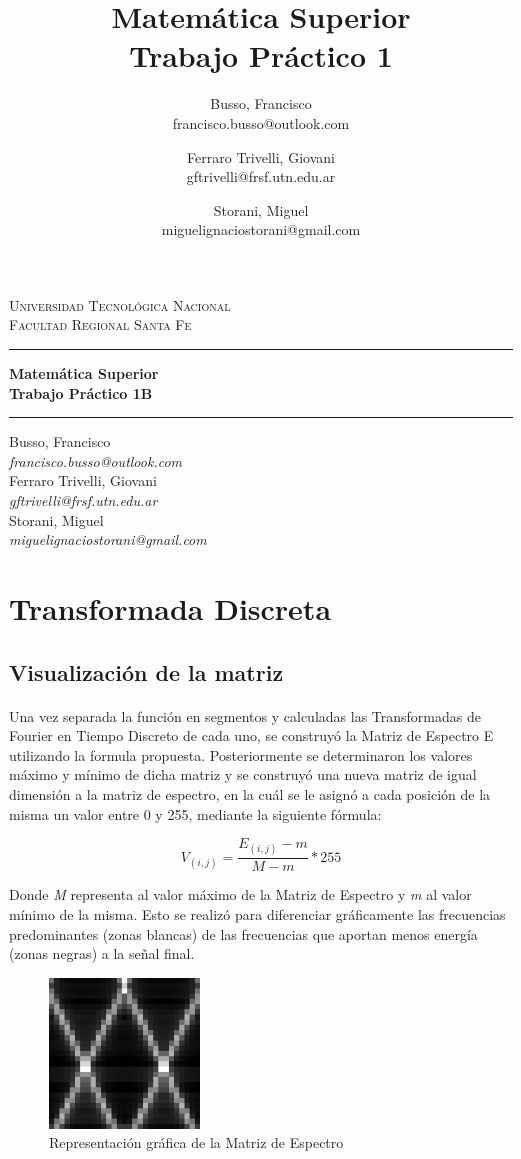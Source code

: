 \documentclass{article}
\title{Matemática Superior\\Trabajo Práctico 1}
\author{ Busso, Francisco\\francisco.busso@outlook.com 
    \and Ferraro Trivelli, Giovani\\gftrivelli@frsf.utn.edu.ar
    \and Storani, Miguel\\ miguelignaciostorani@gmail.com
}
\makeatletter
\renewcommand{\maketitle}{
    \begin{center}
        
        {\scshape{Universidad Tecnológica Nacional\\Facultad Regional Santa Fe}}
        \vspace{10pt}
        \hrule
        \vspace{10pt}
       

        {\LARGE\bfseries{Matemática Superior\\}}
        \vspace{5pt}
        {\Huge\bfseries{Trabajo Práctico 1B}}

        \vspace{8pt}
        \hrule
        \vspace{8pt}

        Busso, Francisco\\
        \textit{francisco.busso@outlook.com}\\
        \vspace{7pt}
        Ferraro Trivelli, Giovani\\
        \textit{gftrivelli@frsf.utn.edu.ar}\\
        \vspace{7pt}
        Storani, Miguel\\
        \textit{miguelignaciostorani@gmail.com}\\

        \thispagestyle{empty}
        
        \newpage
    \end{center}
}
\makeatother
\begin{document}
\maketitle
\newpage

\renewcommand{\contentsname}{Índice}
\tableofcontents
\newpage

    \section{Transformada Discreta}
	\subsection{Visualización de la matriz}

	        \paragraph{}
	        Una vez separada la función en segmentos y calculadas las Transformadas de Fourier en Tiempo Discreto de cada uno, 
	        se construyó la Matriz de Espectro E utilizando la formula propuesta. Posteriormente se determinaron los valores máximo y mínimo de dicha matriz 
	        y se construyó una nueva matriz de igual dimensión a la matriz de espectro, en la cuál se le asignó a cada posición de la misma un valor entre 0 y 255, 
	        mediante la siguiente fórmula:
	
	        \begin{equation}
	            V_{(i, j)}=\frac{E_{(i, j)}-m}{M-m}*255
	        \end{equation}
	
	        Donde \textit{M} representa al valor máximo de la Matriz de Espectro y \textit{m} al valor mínimo de la misma.
	        Esto se realizó para diferenciar gráficamente las frecuencias predominantes (zonas  blancas) 
	        de las frecuencias que aportan menos energía (zonas negras) a la señal final.
	
	        \begin{figure}[h!]
	            \centering
	            \includegraphics[width=40mm]{color_img}
	            \caption{Representación gráfica de la Matriz de Espectro}
	            \label{imagen1}
	        \end{figure}
	
\end{document}
